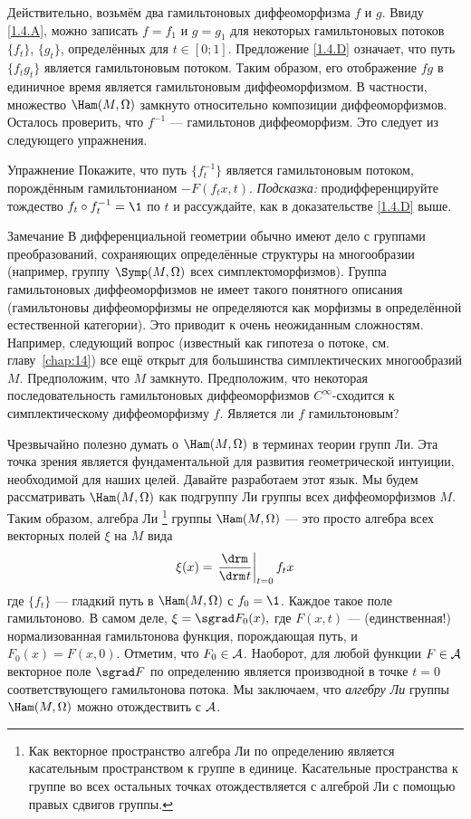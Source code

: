 Действительно, возьмём два гамильтоновых диффеоморфизма $f$ и $g$.
Ввиду \ref{1.4.A}, можно записать $f = f_1$ и $g = g_1$ для некоторых гамильтоновых потоков $\{f_t\}$, $\{g_t\}$, определённых для $t \in [0; 1]$.
Предложение \ref{1.4.D} означает, что путь $\{f_t g_t\}$ является гамильтоновым потоком.
Таким образом, его отображение $f g$ в единичное время является гамильтоновым диффеоморфизмом.
В частности, множество $\Ham (M, \Omega)$ замкнуто относительно композиции диффеоморфизмов.
Осталось проверить, что $f^{-1}$ --- гамильтонов диффеоморфизм.
Это следует из следующего упражнения.

\begin{thm*}{Упражнение} Покажите, что путь $\{f_t^{-1}\}$ является гамильтоновым потоком, порождённым гамильтонианом $-F (f_t x, t)$.
\emph{Подсказка:} продифференцируйте тождество $f_t \circ f_t^{-1} = \1$ по $t$ и рассуждайте, как в доказательстве \ref{1.4.D} выше.
\end{thm*}



\begin{thm}{Замечание}
В дифференциальной геометрии обычно имеют дело с группами преобразований, сохраняющих определённые структуры на многообразии (например, группу $\Symp (M, \Omega)$ всех симплектоморфизмов).
Группа гамильтоновых диффеоморфизмов не имеет такого понятного описания (гамильтоновы диффеоморфизмы не определяются как морфизмы в определённой естественной категории).
Это приводит к очень неожиданным сложностям.
Например, следующий вопрос (известный как гипотеза о потоке, см. главу~\ref{chap:14}) все ещё открыт для большинства симплектических многообразий $M$.
Предположим, что $M$ замкнуто.
Предположим, что некоторая последовательность гамильтоновых диффеоморфизмов $C^\infty$-сходится к симплектическому диффеоморфизму $f$.
Является ли $f$ гамильтоновым?
\end{thm}

Чрезвычайно полезно думать о $\Ham (M, \Omega)$ в терминах теории групп Ли.
Эта точка зрения является фундаментальной для развития геометрической интуиции, необходимой для наших целей.
Давайте разработаем этот язык.
Мы будем рассматривать $\Ham (M, \Omega)$ как подгруппу Ли группы всех диффеоморфизмов $M$.
Таким образом, алгебра Ли%
\footnote{Как векторное пространство алгебра Ли по определению является касательным пространством к
группе в единице.
Касательные пространства к группе во всех остальных точках 
отождествляется с алгеброй Ли с помощью правых сдвигов группы.}
группы $\Ham (M, \Omega)$ --- это просто алгебра всех векторных полей $\xi$ на $M$ вида 
\[\xi(x)=\left.\frac{\d}{\d t}\right|_{t=0}f_tx\]
где $\{f_t\}$ --- гладкий путь в $\Ham (M, \Omega)$ с $f_0 = \1$.
Каждое такое поле гамильтоново.
В самом деле, $\xi = \sgrad F_0 (x),$ где $F (x, t)$ --- (единственная!) нормализованная гамильтонова функция, порождающая путь, и $F_0 (x) = F (x, 0)$.
Отметим, что $F_0 \in \mathcal{A}$.
Наоборот, для любой функции $F \in \mathcal{A}$ векторное поле $\sgrad F$ по определению является производной в точке $t = 0$ соответствующего гамильтонова потока.
Мы заключаем, что \emph{алгебру Ли} группы $\Ham (M, \Omega)$ можно отождествить с $\mathcal{A}$.

